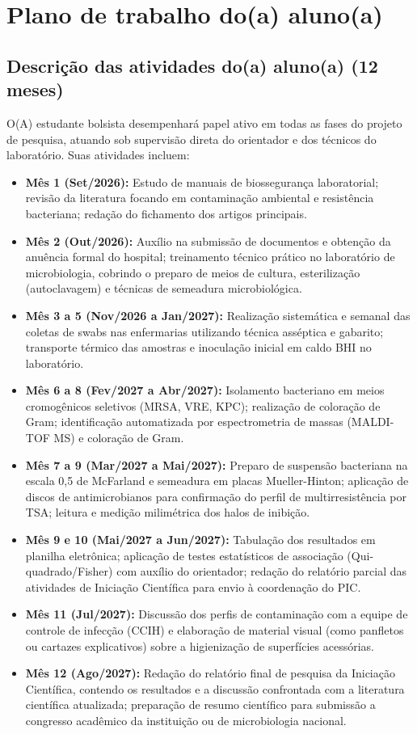 \documentclass[12pt,a4paper]{article}
\begin{document}
\section{Plano de trabalho do(a) aluno(a)}

\subsection{Descrição das atividades do(a) aluno(a) (12 meses)}
O(A) estudante bolsista desempenhará papel ativo em todas as fases do projeto de pesquisa, atuando sob supervisão direta do orientador e dos técnicos do laboratório. Suas atividades incluem:
\begin{itemize}
    \item \textbf{Mês 1 (Set/2026):} Estudo de manuais de biossegurança laboratorial; revisão da literatura focando em contaminação ambiental e resistência bacteriana; redação do fichamento dos artigos principais.
    \item \textbf{Mês 2 (Out/2026):} Auxílio na submissão de documentos e obtenção da anuência formal do hospital; treinamento técnico prático no laboratório de microbiologia, cobrindo o preparo de meios de cultura, esterilização (autoclavagem) e técnicas de semeadura microbiológica.
    \item \textbf{Mês 3 a 5 (Nov/2026 a Jan/2027):} Realização sistemática e semanal das coletas de swabs nas enfermarias utilizando técnica asséptica e gabarito; transporte térmico das amostras e inoculação inicial em caldo BHI no laboratório.
    \item \textbf{Mês 6 a 8 (Fev/2027 a Abr/2027):} Isolamento bacteriano em meios cromogênicos seletivos (MRSA, VRE, KPC); realização de coloração de Gram; identificação automatizada por espectrometria de massas (MALDI-TOF MS) e coloração de Gram.
    \item \textbf{Mês 7 a 9 (Mar/2027 a Mai/2027):} Preparo de suspensão bacteriana na escala 0,5 de McFarland e semeadura em placas Mueller-Hinton; aplicação de discos de antimicrobianos para confirmação do perfil de multirresistência por TSA; leitura e medição milimétrica dos halos de inibição.
    \item \textbf{Mês 9 e 10 (Mai/2027 a Jun/2027):} Tabulação dos resultados em planilha eletrônica; aplicação de testes estatísticos de associação (Qui-quadrado/Fisher) com auxílio do orientador; redação do relatório parcial das atividades de Iniciação Científica para envio à coordenação do PIC.
    \item \textbf{Mês 11 (Jul/2027):} Discussão dos perfis de contaminação com a equipe de controle de infecção (CCIH) e elaboração de material visual (como panfletos ou cartazes explicativos) sobre a higienização de superfícies acessórias.
    \item \textbf{Mês 12 (Ago/2027):} Redação do relatório final de pesquisa da Iniciação Científica, contendo os resultados e a discussão confrontada com a literatura científica atualizada; preparação de resumo científico para submissão a congresso acadêmico da instituição ou de microbiologia nacional.
\end{itemize}
\end{document}
